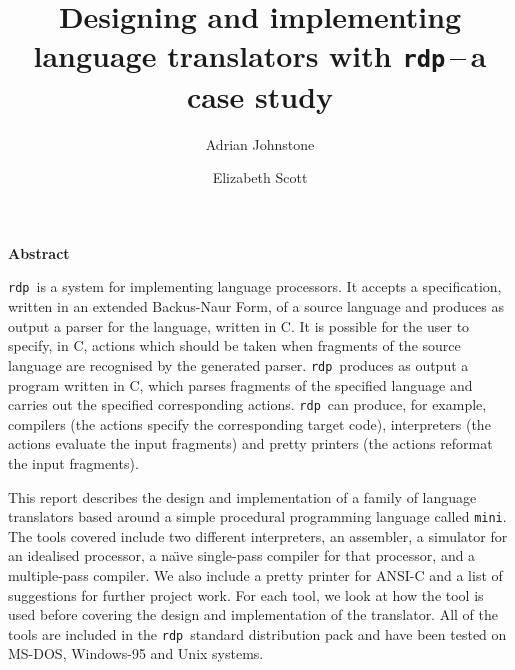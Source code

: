 \renewcommand{\today}{December 20, 1997}
\newcommand{\quietsection}[1]{\subsubsection*{#1}\addcontentsline{toc}{subsection}{#1}}
\newcommand{\errorsection}[1]{\subsubsection*{#1}}
\newcommand{\rdpsupp}{{\mediumseries\tt rdp\_supp}}
\newcommand{\rdp}{{\mediumseries\tt rdp}}
\newcommand{\rdps}{{\mediumseries\tt rdp\ }}
\title{Designing and implementing language translators with \rdp\,--\,a case study}
\author{Adrian Johnstone \and Elizabeth Scott}

\makecstitle %
\thispagestyle{empty}
\vspace*{1cm}
\begin{center}\bf Abstract\end{center}

\rdp\ is a system for implementing language processors. It accepts a
specification, written in an extended Backus-Naur Form, of a source
language and produces as output a parser for the language, written in C.
It is possible for the user to specify, in C, actions which  should be
taken when fragments of the source language are recognised by the
generated parser. \rdp\
produces as output a program written in C, which parses fragments of the
specified language  and carries out the specified corresponding actions.
\rdp\ can produce, for example, compilers (the actions specify the
corresponding target code), interpreters (the actions evaluate the input
fragments) and pretty printers (the actions reformat the input
fragments).

This report describes the design and implementation of a family of
language translators based around a simple procedural programming
language called {\tt mini}. The tools covered include two different
interpreters, an assembler, a simulator  for an idealised processor, a
na\"\i ve single-pass compiler for that processor, and a multiple-pass
compiler. We also include a pretty printer for ANSI-C and a list of suggestions
for further project work. For each tool, we look at how
the tool is used before covering the design and implementation of the
translator. All of the tools are included in the \rdp\ standard
distribution pack and have been tested on MS-DOS, Windows-95 and Unix
systems.

